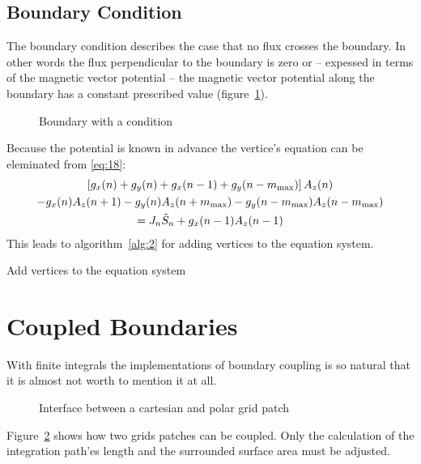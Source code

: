 \subsection{ Boundary Condition}
\label{sec:dirichlet}

The  boundary condition describes the case that no flux
crosses the boundary.  In other words the flux perpendicular to the
boundary is zero or -- expessed in terms of the magnetic vector
potential -- the magnetic vector potential along the boundary has a
constant prescribed value (figure~\ref{fig:diri-condition}).
\begin{figure}
  \centering
  \caption{Boundary with a  condition}
  \label{fig:diri-condition}
\end{figure}
 Because the potential is known in advance
the vertice's equation can be eleminated from \eqref{eq:18}:
\begin{multline}
  \left[g_x(n)+g_y(n)+g_x(n-1)+g_y(n-m_{\text{max}})\right]A_z(n) \\
  -g_x(n)A_z(n+1)-g_y(n)A_z(n+m_{\text{max}})-g_y(n-m_{\text{max}})A_z(n-m_{\text{max}}) \\
  = J_n\tilde{S}_n+g_x(n-1)A_z(n-1)
\end{multline}
This leads to algorithm~\ref{alg:2} for adding 
vertices to the equation system.
\begin{algorithm}
  \caption{Add  vertices to the equation system}
  \label{alg:2}
\end{algorithm}

\section{Coupled Boundaries}
\label{sec:coupled-boundaries}

With finite integrals the implementations of boundary coupling is so
natural that it is almost not worth to mention it at all.
\begin{figure}
  \centering
  \caption{Interface between a cartesian and polar grid patch}
  \label{fig:polar-cartesian}
\end{figure}
Figure~\ref{fig:polar-cartesian} shows how two grids patches can be
coupled.  Only the calculation of the integration path'es length and
the surrounded surface area must be adjusted.  


